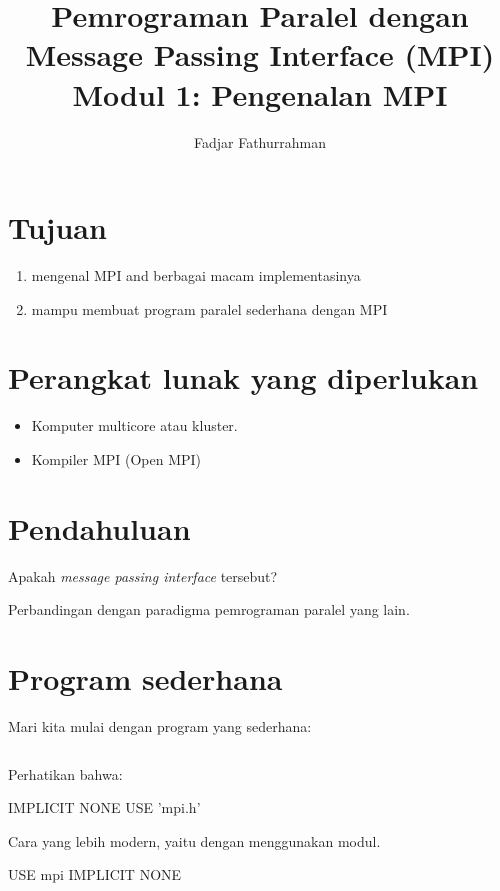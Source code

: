 \documentclass[bahasa,a4paper,12pt]{extarticle}
\begin{document}
\title{%
  \large Pemrograman Paralel dengan Message Passing Interface (MPI) \\
  \Large Modul 1: Pengenalan MPI}
\author{Fadjar Fathurrahman}
\date{}
\maketitle

\section{Tujuan}
\begin{enumerate}
\item mengenal MPI and berbagai macam implementasinya
\item mampu membuat program paralel sederhana dengan MPI
\end{enumerate}

\section{Perangkat lunak yang diperlukan}
\begin{itemize}
\item Komputer multicore atau kluster.
\item Kompiler MPI (Open MPI)
\end{itemize}

\section{Pendahuluan}

Apakah \textit{message passing interface} tersebut?

Perbandingan dengan paradigma pemrograman paralel yang lain.


\section{Program sederhana}

Mari kita mulai dengan program yang sederhana:
\inputminted[breaklines,fontsize=\footnotesize]{fortran}{codes/f90/01_simple.f90}

Perhatikan bahwa:
\begin{fortrancode}
IMPLICIT NONE
USE 'mpi.h'
\end{fortrancode}

Cara yang lebih modern, yaitu dengan menggunakan modul.
\begin{fortrancode}
USE mpi
IMPLICIT NONE
\end{fortrancode}
\end{document}
